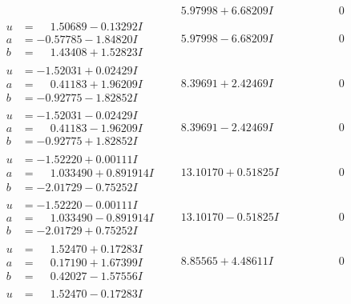 \documentclass[1p]{elsarticle_modified}
\theoremstyle{definition}
\begin{document}
$$\begin{array}{c|c|c}
 & \phantom{-}5.97998 + 6.68209 I & \phantom{-0.000000 } 0 \\ \hline\begin{aligned}
u &= \phantom{-}1.50689 - 0.13292 I \\
a &= -0.57785 - 1.84820 I \\
b &= \phantom{-}1.43408 + 1.52823 I\end{aligned}
 & \phantom{-}5.97998 - 6.68209 I & \phantom{-0.000000 } 0 \\ \hline\begin{aligned}
u &= -1.52031 + 0.02429 I \\
a &= \phantom{-}0.41183 + 1.96209 I \\
b &= -0.92775 - 1.82852 I\end{aligned}
 & \phantom{-}8.39691 + 2.42469 I & \phantom{-0.000000 } 0 \\ \hline\begin{aligned}
u &= -1.52031 - 0.02429 I \\
a &= \phantom{-}0.41183 - 1.96209 I \\
b &= -0.92775 + 1.82852 I\end{aligned}
 & \phantom{-}8.39691 - 2.42469 I & \phantom{-0.000000 } 0 \\ \hline\begin{aligned}
u &= -1.52220 + 0.00111 I \\
a &= \phantom{-}1.033490 + 0.891914 I \\
b &= -2.01729 - 0.75252 I\end{aligned}
 & \phantom{-}13.10170 + 0.51825 I & \phantom{-0.000000 } 0 \\ \hline\begin{aligned}
u &= -1.52220 - 0.00111 I \\
a &= \phantom{-}1.033490 - 0.891914 I \\
b &= -2.01729 + 0.75252 I\end{aligned}
 & \phantom{-}13.10170 - 0.51825 I & \phantom{-0.000000 } 0 \\ \hline\begin{aligned}
u &= \phantom{-}1.52470 + 0.17283 I \\
a &= \phantom{-}0.17190 + 1.67399 I \\
b &= \phantom{-}0.42027 - 1.57556 I\end{aligned}
 & \phantom{-}8.85565 + 4.48611 I & \phantom{-0.000000 } 0 \\ \hline\begin{aligned}
u &= \phantom{-}1.52470 - 0.17283 I \\

\end{aligned}
\end{array}$$
\end{document}
